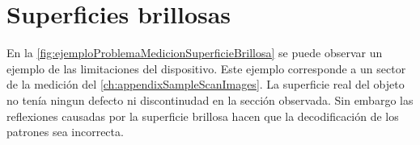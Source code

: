 \chapter{Superficies brillosas}\label{ch:appendixSpecularSurfacesProblems}

En la \autoref{fig:ejemploProblemaMedicionSuperficieBrillosa} se puede observar un ejemplo de las limitaciones del dispositivo. Este ejemplo corresponde a un sector de la medición del \autoref{ch:appendixSampleScanImages}. La superficie real del objeto no tenía ningun defecto ni discontinudad en la sección observada. Sin embargo las reflexiones causadas por la superficie brillosa hacen que la decodificación de los patrones sea incorrecta.

